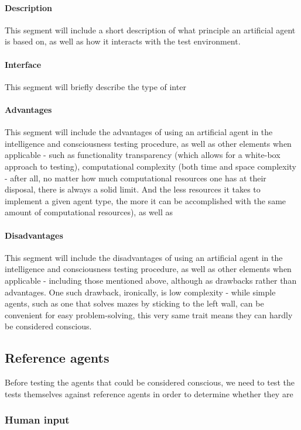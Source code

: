 \documentclass[masterthesis]{fer}
\begin{document}
\paragraph{Description}
This segment will include a short description of what principle an artificial agent is based on, as well as how it interacts with the test environment.
\paragraph{Interface}
This segment will briefly describe the type of inter
\paragraph{Advantages}
This segment will include the advantages of using an artificial agent in the intelligence and consciousness testing procedure, as well as other elements when applicable - such as functionality transparency (which allows for a white-box approach to testing), computational complexity (both time and space complexity - after all, no matter how much computational resources one has at their disposal, there is always a solid limit. And the less resources it takes to implement a given agent type, the more it can be accomplished with the same amount of computational resources), as well as 
\paragraph{Disadvantages}
This segment will include the disadvantages of using an artificial agent in the intelligence and consciousness testing procedure, as well as other elements when applicable - including those mentioned above, although as drawbacks rather than advantages. One such drawback, ironically, is low complexity - while simple agents, such as one that solves mazes by sticking to the left wall, can be convenient for easy problem-solving, this very same trait means they can hardly be considered conscious.
\subsection{Reference agents}
Before testing the agents that could be considered conscious, we need to test the tests themselves against reference agents in order to determine whether they are 
\subsubsection{Human input}
\end{document}
